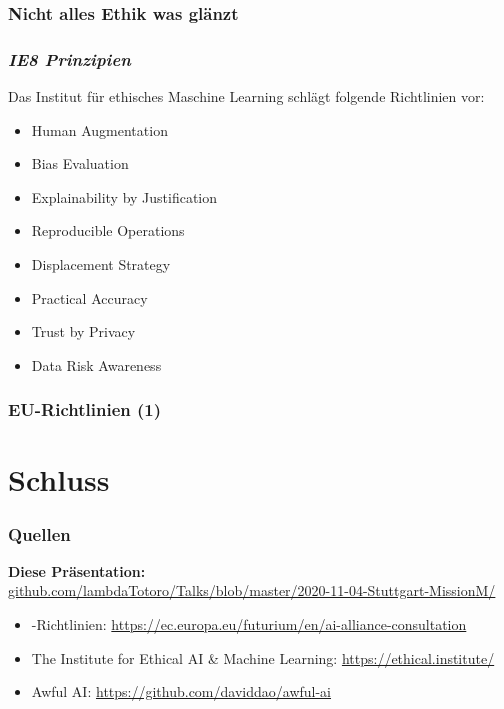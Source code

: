 \documentclass[aspectratio=169,xcolor=dvipsnames]{beamer}
\begin{document}
\begin{frame}
\frametitle{Nicht alles Ethik was glänzt}
\end{frame}

\begin{frame}[fragile]
\frametitle{\emph{IE8 Prinzipien}}
\begin{center}
Das Institut für ethisches Maschine Learning schlägt folgende Richtlinien vor:
\end{center}
\medskip

\large
\setlength{\leftmargini}{150pt}
\begin{itemize}[label=\textcolor{RedOrange}{\textbullet}]
\item Human Augmentation
\item Bias Evaluation
\item Explainability by Justification 
\item Reproducible Operations
\item Displacement Strategy
\item Practical Accuracy
\item Trust by Privacy
\item Data Risk Awareness
\end{itemize}
\end{frame}

\begin{frame}
\frametitle{\emojieu EU-Richtlinien (1)}
\end{frame}

\section{Schluss}



\begin{frame}
\frametitle{Quellen}
\small
\begin{center}
\textbf{Diese Präsentation:}\\
\url{github.com/lambdaTotoro/Talks/blob/master/2020-11-04-Stuttgart-MissionM/}
\end{center}
\bigskip

\begin{itemize}
\item \emojieu -Richtlinien: \url{https://ec.europa.eu/futurium/en/ai-alliance-consultation}
\item The Institute for Ethical AI \& Machine Learning: \url{https://ethical.institute/}
\item Awful AI: \url{https://github.com/daviddao/awful-ai}
\end{itemize}
\end{frame}
\end{document}
